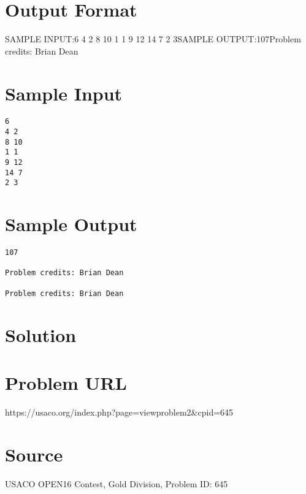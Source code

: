 \documentclass[12pt]{article}
\begin{document}
\section*{Output Format}
SAMPLE INPUT:6
4 2
8 10
1 1
9 12
14 7
2 3SAMPLE OUTPUT:107Problem credits: Brian Dean

\section*{Sample Input}
\begin{verbatim}
6
4 2
8 10
1 1
9 12
14 7
2 3
\end{verbatim}

\section*{Sample Output}
\begin{verbatim}
107

Problem credits: Brian Dean

Problem credits: Brian Dean
\end{verbatim}

\section*{Solution}


\section*{Problem URL}
https://usaco.org/index.php?page=viewproblem2&cpid=645

\section*{Source}
USACO OPEN16 Contest, Gold Division, Problem ID: 645
\end{document}
